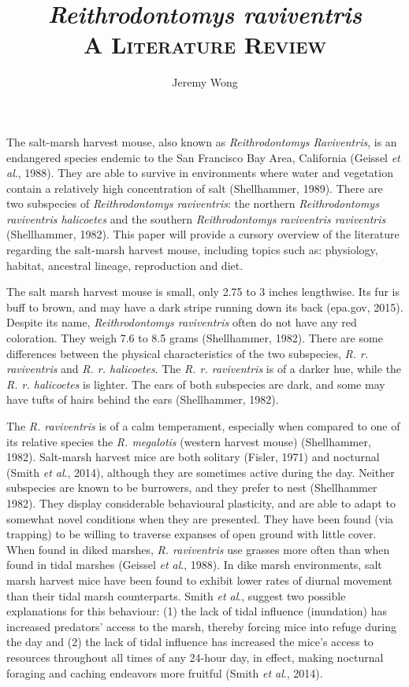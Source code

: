 \documentclass[a4paper]{article}
\author{Jeremy Wong}
\title{\textit{Reithrodontomys raviventris}\\ \textsc{A Literature Review}}
\begin{document}
\maketitle

The salt-marsh harvest mouse, also known as \textit{Reithrodontomys Raviventris}, is an endangered species endemic to the San Francisco Bay Area, California (Geissel \textit{et al}., 1988). They are able to survive in environments where water and vegetation contain a relatively high concentration of salt (Shellhammer, 1989). There are two subspecies of \textit{Reithrodontomys raviventris}: the northern \textit{Reithrodontomys raviventris halicoetes} and the southern \textit{Reithrodontomys raviventris raviventris} (Shellhammer, 1982). This paper will provide a cursory overview of the literature regarding the salt-marsh harvest mouse, including topics such as: physiology, habitat, ancestral lineage, reproduction and diet.

The salt marsh harvest mouse is small, only 2.75 to 3 inches lengthwise. Its fur is buff to brown, and may have a dark stripe running down its back (epa.gov, 2015). Despite its name, \textit{Reithrodontomys raviventris} often do not have any red coloration. They weigh 7.6 to 8.5 grams (Shellhammer, 1982). There are some differences between the physical characteristics of the two subspecies, \textit{R. r. raviventris} and \textit{R. r. halicoetes}. The \textit{R. r. raviventris} is of a darker hue, while the \textit{R. r. halicoetes} is lighter. The ears of both subspecies are dark, and some may have tufts of hairs behind the ears (Shellhammer, 1982).

The \textit{R. raviventris} is of a calm temperament, especially when compared to one of its relative species the \textit{R. megalotis} (western harvest mouse) (Shellhammer, 1982). Salt-marsh harvest mice are both solitary (Fisler, 1971) and nocturnal (Smith \textit{et al}., 2014), although they are sometimes active during the day. Neither subspecies are known to be burrowers, and they prefer to nest (Shellhammer 1982). They display considerable behavioural plasticity, and are able to adapt to somewhat novel conditions when they are presented. They have been found (via trapping) to be willing to traverse expanses of open ground with little cover. When found in diked marshes, \textit{R. raviventris} use grasses more often than when found in tidal marshes (Geissel \textit{et al}., 1988). In dike marsh environments, salt marsh harvest mice have been found to exhibit lower rates of diurnal movement than their tidal marsh counterparts. Smith \textit{et al}., suggest two possible explanations for this behaviour: (1) the lack of tidal influence (inundation) has increased predators' access to the marsh, thereby forcing mice into refuge during the day and (2) the lack of tidal influence has increased the mice's access to resources throughout all times of any 24-hour day, in effect, making nocturnal foraging and caching endeavors more fruitful (Smith \textit{et al}., 2014).
\end{document}
